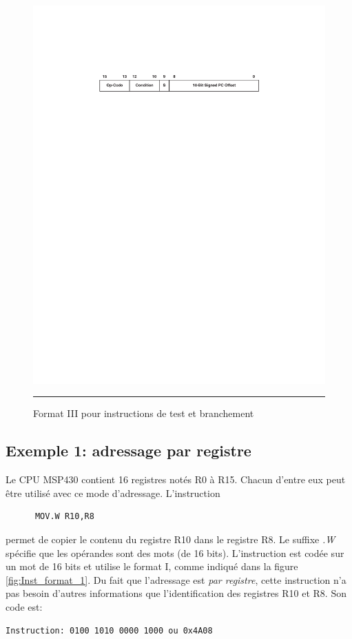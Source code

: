 \begin{figure}[htb]
  \centering
  \includegraphics[angle=0, width=14cm]{./Figures/Assembleur/Inst_format_jump.pdf}
  \rule{35em}{0.5pt}
  \caption[Schéma Timer]{Format III pour instructions de test et branchement}
  \label{fig:Inst_format_jump}
\end{figure}

\pagebreak
\subsection{Exemple 1: adressage par registre}
Le CPU MSP430 contient 16 registres notés R0 à R15. Chacun d'entre eux peut être utilisé avec ce mode d'adressage. L'instruction
\lstset{style=customc}
\begin{lstlisting}
      MOV.W R10,R8
\end{lstlisting}
permet de copier le contenu du registre R10 dans le registre R8. Le suffixe \textit{.W} spécifie que les opérandes sont des mots (de 16 bits).
L'instruction est codée sur un mot de 16 bits et utilise le format I, comme indiqué dans la figure \ref{fig:Inst_format_1}. Du fait que l'adressage est \textit{par registre}, cette instruction n'a pas besoin d'autres informations que l'identification des registres R10 et R8.
Son code est:
\lstset{style=customc}
\begin{lstlisting}
Instruction: 0100 1010 0000 1000 ou 0x4A08
\end{lstlisting}

